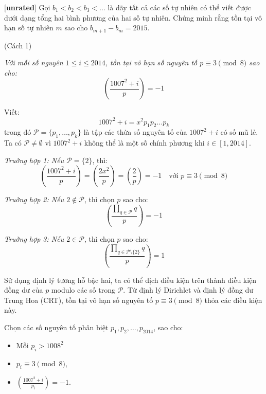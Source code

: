 \documentclass[../09-contruction-methods.tex]{subfiles}
\begin{document}
\begin{example*}\label{example:IRN-2015-TST-D1-P3}[\textbf{unrated}]
	Gọi \( b_1 < b_2 < b_3 < \dots \) là dãy tất cả các số tự nhiên có thể viết được dưới dạng tổng hai bình phương của hai số tự nhiên.
	Chứng minh rằng tồn tại vô hạn số tự nhiên \( m \) sao cho \( b_{m+1} - b_m = 2015 \).
\end{example*}

\begin{soln}(Cách 1)\footnotemark
	\begin{claim*}
		\textit{Với mỗi số nguyên \( 1 \leq i \leq 2014 \), tồn tại vô hạn số nguyên tố \( p \equiv 3 \pmod{8} \) sao cho:}
		\[
			\left( \frac{1007^2 + i}{p} \right) = -1
		\]	
	\end{claim*}
	\begin{subproof}
		Viết:
		\[
			1007^2 + i = x^2 p_1 p_2 \dots p_k
		\]
		trong đó \( \mathcal{P} = \{ p_1, \dots, p_k \} \) là tập các thừa số nguyên tố của \( 1007^2 + i \) có số mũ lẻ.
		Ta có \( \mathcal{P} \ne \emptyset \) vì \( 1007^2 + i \) không thể là một số chính phương khi \( i \in [1, 2014] \).
		
		\textit{Truờng hợp 1: Nếu \( \mathcal{P} = \{2\} \)}, thì:
		\[
			\left( \frac{1007^2 + i}{p} \right) = \left( \frac{2x^2}{p} \right) = \left( \frac{2}{p} \right) = -1 \quad \text{với } p \equiv 3 \pmod{8}
		\]
		
		\textit{Truờng hợp 2: Nếu \( 2 \notin \mathcal{P} \)}, thì chọn \( p \) sao cho:
		\[
			\left( \frac{\prod_{q \in \mathcal{P}} q}{p} \right) = -1
		\]
		
		\textit{Truờng hợp 3: Nếu \( 2 \in \mathcal{P} \)}, thì chọn \( p \) sao cho:
		\[
		\left( \frac{\prod_{q \in \mathcal{P} \setminus \{2\}} q}{p} \right) = 1
		\]
		
		Sử dụng định lý tương hỗ bậc hai, ta có thể dịch điều kiện trên thành điều kiện đồng dư của \( p \) modulo các số trong \( \mathcal{P} \).
		Từ định lý Dirichlet và định lý đồng dư Trung Hoa (CRT), tồn tại vô hạn số nguyên tố \( p \equiv 3 \pmod{8} \) thỏa các điều kiện này.
	\end{subproof}
	
	Chọn các số nguyên tố phân biệt \( p_1, p_2, \dots, p_{2014} \), sao cho:
    \begin{itemize}[topsep=0pt, partopsep=0pt, itemsep=0pt]
        \item Mỗi \( p_i > 1008^2 \)
        \item \( p_i \equiv 3 \pmod{8} \),
        \item \( \left( \frac{1007^2 + i}{p_i} \right) = -1. \)
    \end{itemize}
	

\end{soln}
\end{document}
